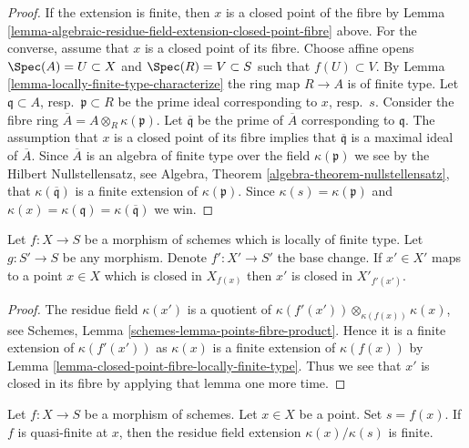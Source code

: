 \begin{proof}
If the extension is finite, then $x$ is a closed point of
the fibre by
Lemma \ref{lemma-algebraic-residue-field-extension-closed-point-fibre}
above. For the converse, assume that $x$ is a closed point
of its fibre. Choose affine opens $\Spec(A) = U \subset X$
and $\Spec(R) = V \subset S$ such that $f(U) \subset V$.
By Lemma \ref{lemma-locally-finite-type-characterize} the ring map
$R \to A$ is of finite type. Let $\mathfrak q \subset A$,
resp.\ $\mathfrak p \subset R$ be the prime ideal corresponding
to $x$, resp.\ $s$. Consider the fibre ring
$\overline{A} = A \otimes_R \kappa(\mathfrak p)$.
Let $\overline{\mathfrak q}$ be the prime of $\overline{A}$
corresponding to $\mathfrak q$. The assumption that $x$
is a closed point of its fibre implies that $\overline{\mathfrak q}$
is a maximal ideal of $\overline{A}$. Since $\overline{A}$
is an algebra of finite type over the field $\kappa(\mathfrak p)$
we see by the Hilbert Nullstellensatz, see
Algebra, Theorem \ref{algebra-theorem-nullstellensatz},
that $\kappa(\overline{\mathfrak q})$ is a finite extension
of $\kappa(\mathfrak p)$.
Since $\kappa(s) = \kappa(\mathfrak p)$ and
$\kappa(x) = \kappa(\mathfrak q) = \kappa(\overline{\mathfrak q})$
we win.
\end{proof}

\begin{lemma}
\label{lemma-base-change-closed-point-fibre-locally-finite-type}
Let $f : X \to S$ be a morphism of schemes which is locally of finite type.
Let $g : S' \to S$ be any morphism. Denote $f' : X' \to S'$ the base change.
If $x' \in X'$ maps to a point $x \in X$ which is closed in $X_{f(x)}$
then $x'$ is closed in $X'_{f'(x')}$.
\end{lemma}

\begin{proof}
The residue field $\kappa(x')$ is a quotient of
$\kappa(f'(x')) \otimes_{\kappa(f(x))} \kappa(x)$, see
Schemes, Lemma \ref{schemes-lemma-points-fibre-product}.
Hence it is a finite extension of $\kappa(f'(x'))$ as
$\kappa(x)$ is a finite extension of $\kappa(f(x))$ by
Lemma \ref{lemma-closed-point-fibre-locally-finite-type}.
Thus we see that $x'$ is closed in its fibre by applying that lemma
one more time.
\end{proof}

\begin{lemma}
\label{lemma-residue-field-quasi-finite}
Let $f : X \to S$ be a morphism of schemes.
Let $x \in X$ be a point. Set $s = f(x)$.
If $f$ is quasi-finite at $x$, then the residue field
extension $\kappa(x)/\kappa(s)$ is finite.
\end{lemma}

